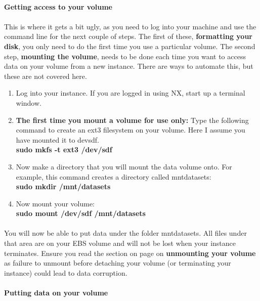 \paragraph{Getting access to  your volume}
\paragraph{}\label{text:mounting}This is where it gets a bit ugly, as you need to log into your machine and use the command line for the next couple of steps. The first of these, \textbf{formatting your disk}, you only need to do the first time you use a particular volume. The second step, \textbf{mounting the volume}, needs to be done each time you want to access data on your volume from a new instance. There are ways to automate this, but these are not covered here. 

\begin{enumerate}
\item Log into your instance. If you are logged in using NX, start up a terminal window.
\item \textbf{The first time you mount a volume for use only:} Type the following command to create an ext3 filesystem on your volume. Here I assume you have mounted it to \/dev\/sdf. 
\\\textbf{sudo mkfs -t ext3 /dev/sdf }
\item Now make a directory that you will mount the data volume onto. For example, this command creates a directory called \/mnt\/datasets:
\\\textbf{sudo mkdir /mnt/datasets}
\item Now mount your volume:
\\\textbf{sudo mount /dev/sdf /mnt/datasets}
\end{enumerate}

\paragraph{}You will now be able to put data under the folder \/mnt\/datasets. All files under that area are on your EBS volume and will not be lost when your instance terminates. Ensure you read the section on page \pageref{text:unmounting} on \textbf{unmounting your volume} as failure to unmount before detaching your volume (or terminating your instance) could lead to data corruption. 

\paragraph{Putting data on your volume}



